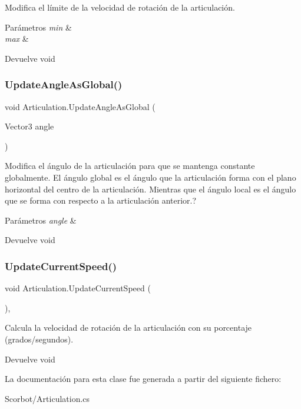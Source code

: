 Modifica el límite de la velocidad de rotación de la articulación. 
\begin{DoxyParams}{Parámetros}
{\em min} & \\
\hline
{\em max} & \\
\hline
\end{DoxyParams}
\begin{DoxyReturn}{Devuelve}
void 
\end{DoxyReturn}
\mbox{\label{class_articulation_a94f0c8fac481b23ec71ac8c4cd8b0862}} 
\subsubsection{\texorpdfstring{UpdateAngleAsGlobal()}{UpdateAngleAsGlobal()}}
{\footnotesize\ttfamily void Articulation.\+Update\+Angle\+As\+Global (\begin{DoxyParamCaption}\item[{Vector3}]{angle }\end{DoxyParamCaption})\hspace{0.3cm}{\ttfamily [inline]}}

Modifica el ángulo de la articulación para que se mantenga constante globalmente. El ángulo global es el ángulo que la articulación forma con el plano horizontal del centro de la articulación. Mientras que el ángulo local es el ángulo que se forma con respecto a la articulación anterior.? 
\begin{DoxyParams}{Parámetros}
{\em angle} & \\
\hline
\end{DoxyParams}
\begin{DoxyReturn}{Devuelve}
void 
\end{DoxyReturn}
\mbox{\label{class_articulation_a88aec688de1ef2c8b019709865be4383}} 
\subsubsection{\texorpdfstring{UpdateCurrentSpeed()}{UpdateCurrentSpeed()}}
{\footnotesize\ttfamily void Articulation.\+Update\+Current\+Speed (\begin{DoxyParamCaption}{ }\end{DoxyParamCaption})\hspace{0.3cm}{\ttfamily [inline]}, {\ttfamily [private]}}

Calcula la velocidad de rotación de la articulación con su porcentaje (grados/segundos). \begin{DoxyReturn}{Devuelve}
void 
\end{DoxyReturn}


La documentación para esta clase fue generada a partir del siguiente fichero\+:\begin{DoxyCompactItemize}
\item 
Scorbot/Articulation.\+cs\end{DoxyCompactItemize}
